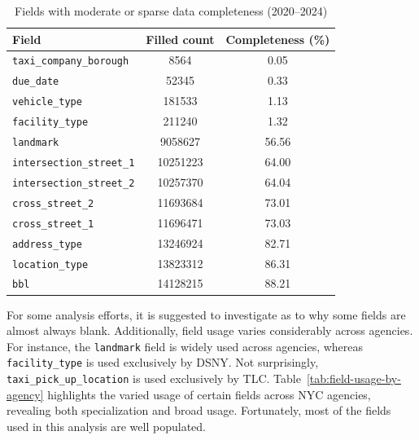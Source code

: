 \documentclass[linenumber]{jdsart}
\begin{document}
\begin{table}[tbp]
\centering
\caption{Fields with moderate or sparse data completeness (2020--2024)}
\label{tab:completeness-lower}
\small
\begin{tabular}{
  l
  S[table-format=8.0]
  S[table-format=2.2]
}
\toprule
{Field} & {Filled count} & {Completeness (\%)} \\
\midrule
\texttt{taxi\_company\_borough} & 8564      & 0.05 \\
\texttt{due\_date}              & 52345     & 0.33 \\
\texttt{vehicle\_type}          & 181533    & 1.13 \\
\texttt{facility\_type}         & 211240    & 1.32 \\
\cmidrule(lr){1-3}
\texttt{landmark}               & 9058627   & 56.56 \\
\texttt{intersection\_street\_1}& 10251223  & 64.00 \\
\texttt{intersection\_street\_2}& 10257370  & 64.04 \\
\texttt{cross\_street\_2}       & 11693684  & 73.01 \\
\texttt{cross\_street\_1}       & 11696471  & 73.03 \\
\texttt{address\_type}          & 13246924  & 82.71 \\
\texttt{location\_type}         & 13823312  & 86.31 \\
\texttt{bbl}                    & 14128215  & 88.21 \\
\bottomrule
\end{tabular}
\end{table}


For some analysis efforts, it is suggested to investigate as to 
why some fields are almost always blank. Additionally, 
field usage varies considerably across agencies. For instance,
the \texttt{landmark} field is widely used across agencies, 
whereas \texttt{facility\_type} is used exclusively by 
DSNY. Not surprisingly, 
\texttt{taxi\_pick\_up\_location} is used exclusively by TLC. 
Table~\ref{tab:field-usage-by-agency} highlights the varied usage of
certain fields across NYC agencies, revealing both specialization and
broad usage. Fortunately, most of the fields used in 
this analysis are well populated.
\end{document}

